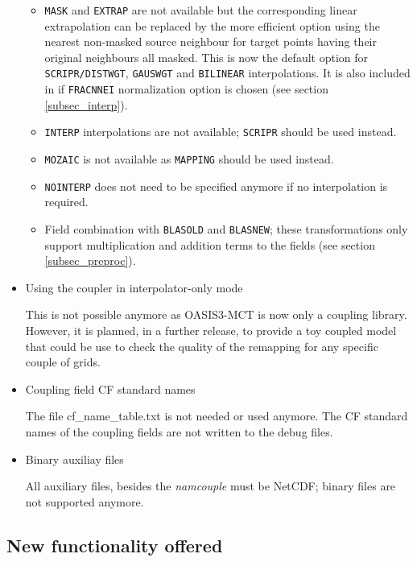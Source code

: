 \begin{itemize}
\begin{itemize}
\item {\tt MASK} and {\tt EXTRAP} are not available but the corresponding
linear extrapolation can be replaced by the more efficient option
using the nearest non-masked source neighbour for target points having
their original neighbours all masked. This is now the default option for {\tt SCRIPR/}{\tt DISTWGT}, {\tt GAUSWGT} and {\tt BILINEAR} interpolations. It is
also included in  if {\tt FRACNNEI}
normalization option is chosen (see section \ref{subsec_interp}).

\item {\tt INTERP} interpolations are not available; {\tt SCRIPR}
  should be used instead.

\item {\tt MOZAIC} is not available as {\tt MAPPING} should be used
  instead.

\item{\tt NOINTERP} does not need to be specified anymore if no
  interpolation is required.
 
\item Field combination with {\tt BLASOLD} and {\tt BLASNEW}; these
  transformations only support multiplication and addition terms to
the fields (see section \ref{subsec_preproc}). 

\end{itemize}

\item Using the coupler in interpolator-only mode

This is not possible anymore as OASIS3-MCT is now only a coupling
library. However, it is planned, in a further release, to provide a
toy coupled model that could be use to check the quality of the
remapping for any specific couple of grids.

\item Coupling field CF standard names

The file cf\_name\_table.txt is not needed or used anymore. The CF
  standard names of the coupling fields are not written to the debug
  files.

\item Binary auxiliay files

All auxiliary files, besides the {\it namcouple} must be NetCDF;
  binary files are not supported anymore.
\end{itemize}

\subsection{New functionality offered}
\label{sec_changes_new}


